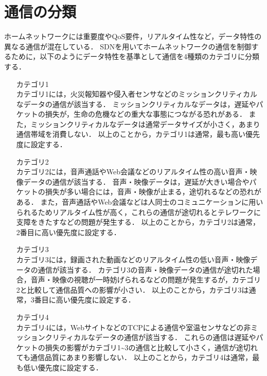 \documentclass[a4paper,11pt,uplatex]{ujreport}
\begin{document}
\section{通信の分類}
\label{sec:通信の分類}

  ホームネットワークには重要度やQoS要件，リアルタイム性など，データ特性の異なる通信が混在している．
  SDNを用いてホームネットワークの通信を制御するために，以下のようにデータ特性を基準として通信を4種類のカテゴリに分類する．

  \begin{itemize}
    \setlength{\leftskip}{1.0cm}
    \item[カテゴリ1]\mbox{}\\
          カテゴリ1には，火災報知器や侵入者センサなどのミッションクリティカルなデータの通信が該当する．
          ミッションクリティカルなデータは，遅延やパケットの損失が，生命の危機などの重大な事態につながる恐れがある．
          また，ミッションクリティカルなデータは通常データサイズが小さく，あまり通信帯域を消費しない．
          以上のことから，カテゴリ1は通常，最も高い優先度に設定する．
    \item[カテゴリ2]\mbox{}\\
          カテゴリ2には，音声通話やWeb会議などのリアルタイム性の高い音声・映像データの通信が該当する．
          音声・映像データは，遅延が大きい場合やパケットの損失が多い場合には，音声・映像が止まる，途切れるなどの恐れがある．
          また，音声通話やWeb会議などは人同士のコミュニケーションに用いられるためリアルタイム性が高く，これらの通信が途切れるとテレワークに支障をきたすなどの問題が発生する．
          以上のことから，カテゴリ2は通常，2番目に高い優先度に設定する．
    \item[カテゴリ3]\mbox{}\\
          カテゴリ3には，録画された動画などのリアルタイム性の低い音声・映像データの通信が該当する．
          カテゴリ3の音声・映像データの通信が途切れた場合，音声・映像の視聴が一時妨げられるなどの問題が発生するが，カテゴリ2と比較して通信品質への影響が小さい．
          以上のことから，カテゴリ3は通常，3番目に高い優先度に設定する．
    \item[カテゴリ4]\mbox{}\\   
          カテゴリ4には，WebサイトなどのTCPによる通信や室温センサなどの非ミッションクリティカルなデータの通信が該当する．
          これらの通信は遅延やパケットの損失の影響がカテゴリ1\textasciitilde3の通信と比較して小さく，通信が途切れても通信品質にあまり影響しない．
          以上のことから，カテゴリ4は通常，最も低い優先度に設定する．

  \end{itemize}
\end{document}

